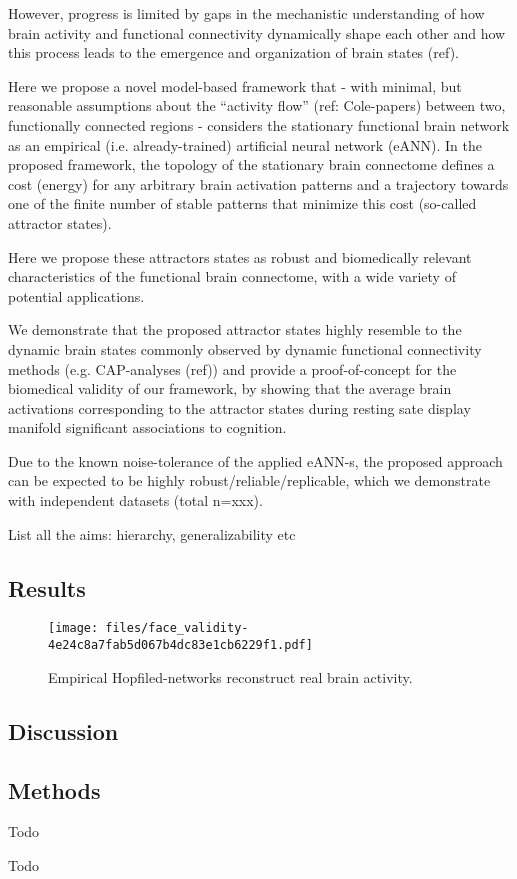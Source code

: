 \documentclass[twocolumn, switch]{article}
\begin{document}
However, progress is limited by gaps in the mechanistic understanding of how brain activity and functional connectivity dynamically shape each other and how this process leads to the emergence and organization of brain states (ref).

Here we propose a novel model-based framework that - with minimal, but reasonable assumptions about the ``activity flow'' (ref: Cole-papers) between two, functionally connected regions - considers the stationary functional brain network as an empirical (i.e. already-trained) artificial neural network (eANN). In the proposed framework, the topology of the stationary brain connectome defines a cost (energy) for any arbitrary brain activation patterns and a trajectory towards one of the finite number of stable patterns that minimize this cost (so-called attractor states).

Here we propose these attractors states as robust and biomedically relevant characteristics of the functional brain connectome, with a wide variety of potential applications.

We demonstrate that the proposed attractor states highly resemble to the dynamic brain states commonly observed by dynamic functional connectivity methods (e.g. CAP-analyses (ref)) and provide a proof-of-concept for the biomedical validity of our framework, by showing that the average brain activations corresponding to the attractor states during resting sate display manifold significant associations to cognition.

Due to the known noise-tolerance of the applied eANN-s, the proposed approach can be expected to be highly robust/reliable/replicable, which we demonstrate with independent datasets (total n=xxx).

List all the aims: hierarchy, generalizability etc

\subsection{Results}\label{Results}

\begin{figure}[!htbp]
\centering
\texttt{[image: files/face\_validity-4e24c8a7fab5d067b4dc83e1cb6229f1.pdf]}
\caption{Empirical Hopfiled-networks reconstruct real brain activity.}
\label{Figure 1}
\end{figure}

\subsection{Discussion}\label{Discussion}

\subsection{Methods}\label{Methods}

Todo

Todo




\end{document}
